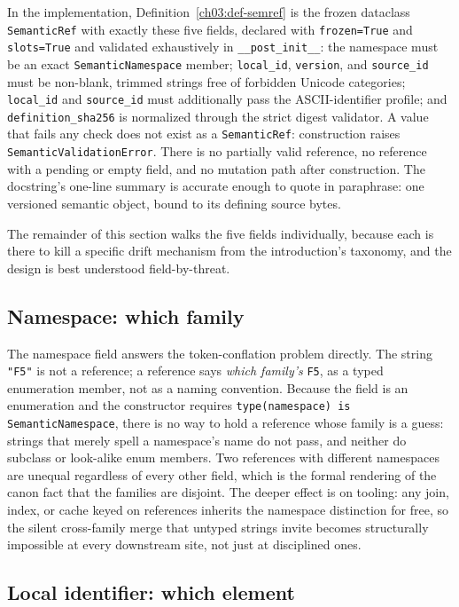 In the implementation, Definition~\ref{ch03:def-semref} is the
frozen dataclass \texttt{SemanticRef} with exactly these five
fields, declared with \texttt{frozen=True} and \texttt{slots=True}
and validated exhaustively in \texttt{\_\_post\_init\_\_}: the
namespace must be an exact \texttt{SemanticNamespace} member;
\texttt{local\_id}, \texttt{version}, and \texttt{source\_id} must
be non-blank, trimmed strings free of forbidden Unicode categories;
\texttt{local\_id} and \texttt{source\_id} must additionally pass
the ASCII-identifier profile; and \texttt{definition\_sha256} is
normalized through the strict digest validator. A value that fails
any check does not exist as a \texttt{SemanticRef}: construction
raises \texttt{SemanticValidationError}. There is no partially
valid reference, no reference with a pending or empty field, and no
mutation path after construction. The docstring's one-line summary
is accurate enough to quote in paraphrase: one versioned semantic
object, bound to its defining source bytes.

The remainder of this section walks the five fields individually,
because each is there to kill a specific drift mechanism from the
introduction's taxonomy, and the design is best understood
field-by-threat.

\subsection{Namespace: which family}\label{ch03:field-namespace}

The namespace field answers the token-conflation problem directly.
The string \texttt{"F5"} is not a reference; a reference says
\emph{which family's} \texttt{F5}, as a typed enumeration member,
not as a naming convention. Because the field is an enumeration and
the constructor requires \texttt{type(namespace) is
SemanticNamespace}, there is no way to hold a reference whose
family is a guess: strings that merely spell a namespace's name do
not pass, and neither do subclass or look-alike enum members. Two
references with different namespaces are unequal regardless of
every other field, which is the formal rendering of the canon fact
that the families are disjoint. The deeper effect is on tooling:
any join, index, or cache keyed on references inherits the
namespace distinction for free, so the silent cross-family merge
that untyped strings invite becomes structurally impossible at
every downstream site, not just at disciplined ones.

\subsection{Local identifier: which element}\label{ch03:field-localid}

